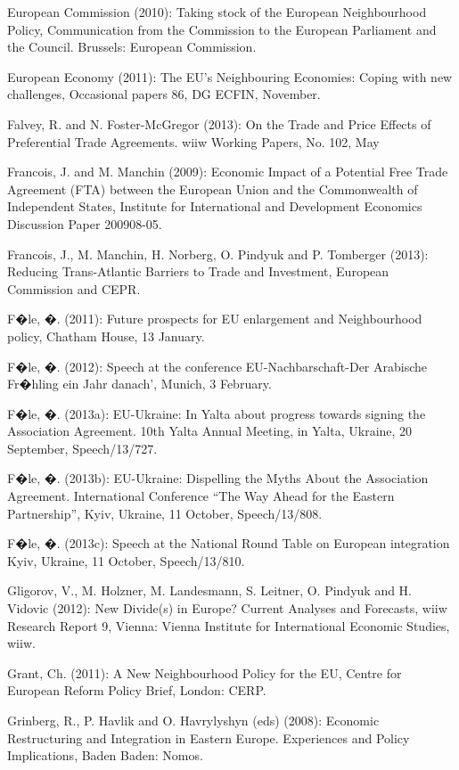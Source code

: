 European Commission (2010): Taking stock of the European Neighbourhood Policy, Communication from the Commission to the European Parliament and the Council. Brussels: European Commission.

European Economy (2011): The EU's Neighbouring Economies: Coping with new challenges, Occasional papers 86, DG ECFIN, November.

Falvey, R. and N. Foster-McGregor (2013): On the Trade and Price Effects of Preferential Trade Agreements. wiiw Working Papers, No. 102, May

Francois, J. and M. Manchin (2009): Economic Impact of a Potential Free Trade Agreement (FTA) between the European Union and the Commonwealth of Independent States, Institute for International and Development Economics Discussion Paper 200908-05.

Francois, J., M. Manchin, H. Norberg, O. Pindyuk and P. Tomberger (2013): Reducing Trans-Atlantic Barriers to Trade and Investment, European Commission and CEPR.

F�le, �. (2011): Future prospects for EU enlargement and Neighbourhood policy, Chatham House, 13 January.

F�le, �. (2012): Speech at the conference EU-Nachbarschaft-Der Arabische Fr�hling ein Jahr danach', Munich, 3 February.

F�le, �. (2013a): EU-Ukraine: In Yalta about progress towards signing the Association Agreement. 10th Yalta Annual Meeting, in Yalta, Ukraine, 20 September, Speech/13/727.

F�le, �. (2013b): EU-Ukraine: Dispelling the Myths About the Association Agreement. International Conference ``The Way Ahead for the Eastern Partnership'', Kyiv, Ukraine, 11 October, Speech/13/808.

F�le, �. (2013c): Speech at the National Round Table on European integration Kyiv, Ukraine, 11 October, Speech/13/810.

Gligorov, V., M. Holzner, M. Landesmann, S. Leitner, O. Pindyuk and H. Vidovic (2012): New Divide(s) in Europe? Current Analyses and Forecasts, wiiw Research Report 9, Vienna: Vienna Institute for International Economic Studies, wiiw.

Grant, Ch. (2011): A New Neighbourhood Policy for the EU, Centre for European Reform Policy Brief, London: CERP.

Grinberg, R., P. Havlik and O. Havrylyshyn (eds) (2008): Economic Restructuring and Integration in Eastern Europe. Experiences and Policy Implications, Baden Baden: Nomos.

